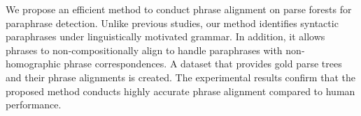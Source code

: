 We propose an efficient method to conduct phrase alignment on parse forests for paraphrase detection. Unlike previous studies, our method identifies syntactic paraphrases under linguistically motivated grammar. In addition, it allows phrases to non-compositionally align to handle paraphrases with non-homographic phrase correspondences. A dataset that provides gold parse trees and their phrase alignments is created. The experimental results confirm that the proposed method conducts highly accurate phrase alignment compared to human performance.
